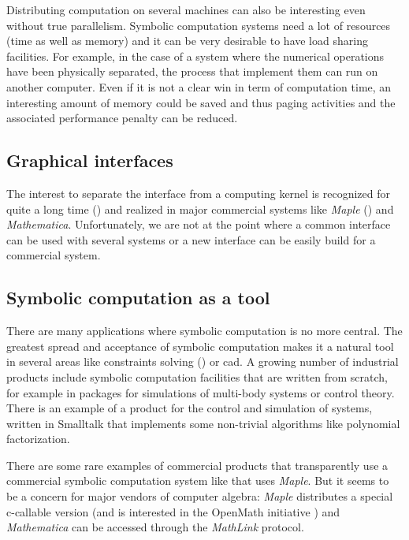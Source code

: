 \documentclass {article}
\begin{document}
Distributing computation on several machines can also be interesting even 
without true parallelism.
Symbolic computation systems need a lot of resources (time as well as memory)
and it can be very desirable to have load sharing facilities. For example, in
the case of a system where the numerical operations have been physically
separated, the process that implement them can run on another computer. Even
if it is not a clear win in term of computation time, an interesting amount of
memory could be saved and thus paging activities and the associated
performance penalty can be reduced.

\subsection*{ Graphical interfaces }

The interest to separate the interface from a computing kernel is
recognized for quite a long time (\cite{kn:camino}) and realized in major
commercial systems like {\sl Maple} (\cite{kn:iris}) and {\sl Mathematica}.
Unfortunately, we are not at the point where a common interface can be used
with several systems or a new interface can be easily build for a commercial
system. 

\subsection*{ Symbolic computation as a tool}

There are many applications where symbolic computation is no more central.
The greatest spread and acceptance of symbolic computation makes it a natural
tool in several areas like constraints solving (\cite{RMPASCO94}) or {\sc cad}.
A growing number of industrial products include symbolic computation
facilities that are written from scratch, 
for example in packages for simulations of multi-body systems
or control theory. There is an example of a product for the control
and simulation of systems, written in Smalltalk that implements some
non-trivial algorithms like polynomial factorization. 

There are some rare examples of commercial products that transparently use a
commercial symbolic computation system like \cite{kn:TMcLH94} that uses 
{\sl Maple}. But it seems to be a concern for major vendors of computer
algebra: {\sl Maple} distributes a special {\sc c}-callable version (and
is interested in the OpenMath initiative \cite{OpenMath.htmp})
and {\sl Mathematica} can be accessed through the {\sl MathLink} protocol.
\end{document}

